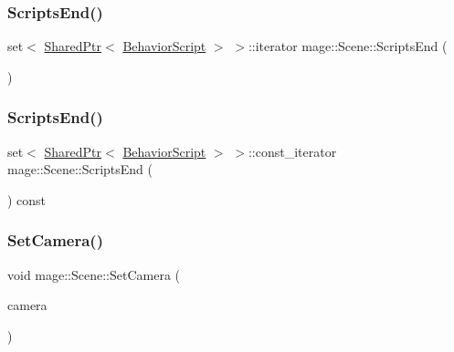 \hypertarget{classmage_1_1_scene_a2b0d4504f5b683767f1cd08ca8ab6f42}{}\label{classmage_1_1_scene_a2b0d4504f5b683767f1cd08ca8ab6f42} 
\subsubsection{\texorpdfstring{Scripts\+End()}{ScriptsEnd()}\hspace{0.1cm}{\footnotesize\ttfamily [1/2]}}
{\footnotesize\ttfamily set$<$ \hyperlink{namespacemage_a1e01ae66713838a7a67d30e44c67703e}{Shared\+Ptr}$<$ \hyperlink{classmage_1_1_behavior_script}{Behavior\+Script} $>$ $>$\+::iterator mage\+::\+Scene\+::\+Scripts\+End (\begin{DoxyParamCaption}{ }\end{DoxyParamCaption})}

\hypertarget{classmage_1_1_scene_ab607911e4efd677a08f54101aa8bf2fb}{}\label{classmage_1_1_scene_ab607911e4efd677a08f54101aa8bf2fb} 
\subsubsection{\texorpdfstring{Scripts\+End()}{ScriptsEnd()}\hspace{0.1cm}{\footnotesize\ttfamily [2/2]}}
{\footnotesize\ttfamily set$<$ \hyperlink{namespacemage_a1e01ae66713838a7a67d30e44c67703e}{Shared\+Ptr}$<$ \hyperlink{classmage_1_1_behavior_script}{Behavior\+Script} $>$ $>$\+::const\+\_\+iterator mage\+::\+Scene\+::\+Scripts\+End (\begin{DoxyParamCaption}{ }\end{DoxyParamCaption}) const}

\hypertarget{classmage_1_1_scene_a57718151e0102306b3abb22da45ae27a}{}\label{classmage_1_1_scene_a57718151e0102306b3abb22da45ae27a} 
\subsubsection{\texorpdfstring{Set\+Camera()}{SetCamera()}}
{\footnotesize\ttfamily void mage\+::\+Scene\+::\+Set\+Camera (\begin{DoxyParamCaption}\item[{\hyperlink{namespacemage_a1e01ae66713838a7a67d30e44c67703e}{Shared\+Ptr}$<$ \hyperlink{classmage_1_1_camera}{Camera} $>$}]{camera }\end{DoxyParamCaption})}


